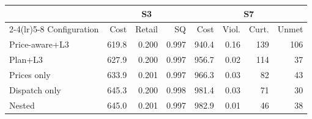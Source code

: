\begin{tabular}{@{}lrrrrrrr@{}}
\toprule
 & \multicolumn{3}{c}{S3} & \multicolumn{4}{c}{S7} \\
\cmidrule(lr){2-4}\cmidrule(lr){5-8}
Configuration & Cost & Retail & SQ & Cost & Viol. & Curt. & Unmet \\
\midrule
Price-aware+L3 & 619.8 & 0.200 & 0.997 & 940.4 & 0.16 & 139 & 106 \\
Plan+L3 & 627.9 & 0.200 & 0.997 & 956.7 & 0.02 & 114 & 37 \\
Prices only & 633.9 & 0.201 & 0.997 & 966.3 & 0.03 & 82 & 43 \\
Dispatch only & 645.3 & 0.200 & 0.998 & 981.4 & 0.03 & 71 & 30 \\
Nested & 645.0 & 0.201 & 0.997 & 982.9 & 0.01 & 46 & 38 \\
\bottomrule
\end{tabular}
